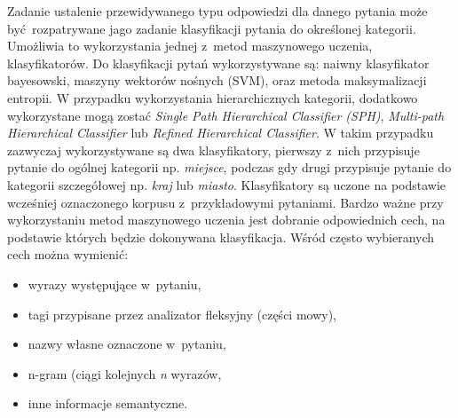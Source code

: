\documentclass[a4paper, twoside, openright, 12pt]{report}
\begin{document}
            Zadanie ustalenie przewidywanego typu odpowiedzi dla danego pytania może być rozpatrywane jago zadanie
            klasyfikacji pytania do określonej kategorii. Umożliwia to wykorzystania jednej z~metod maszynowego uczenia,
            klasyfikatorów. Do klasyfikacji pytań wykorzystywane są: naiwny klasyfikator bayesowski, maszyny wektorów
            nośnych (SVM), oraz metoda maksymalizacji entropii. W przypadku wykorzystania hierarchicznych kategorii,
            dodatkowo wykorzystane mogą zostać \emph{Single Path Hierarchical Classifier (SPH)}, \emph{Multi-path
            Hierarchical Classifier} lub \emph{Refined Hierarchical Classifier}\cite{MLQUESTIONFOCUS}. W takim przypadku
            zazwyczaj wykorzystywane są dwa klasyfikatory, pierwszy z~nich przypisuje pytanie do ogólnej kategorii np.
            \emph{miejsce}, podczas gdy drugi przypisuje pytanie do kategorii szczegółowej np. \emph{kraj} lub \emph{miasto}.
            Klasyfikatory
            są uczone na podstawie wcześniej oznaczonego korpusu z~przykładowymi pytaniami. Bardzo ważne przy wykorzystaniu
            metod maszynowego uczenia jest dobranie odpowiednich cech, na podstawie których będzie dokonywana klasyfikacja.
            Wśród często wybieranych cech można wymienić\cite{HANDBOOKNLP}:
            \begin{itemize}
                \item wyrazy występujące w~pytaniu,
                \item tagi przypisane przez analizator fleksyjny (części mowy),
                \item nazwy własne oznaczone w~pytaniu,
                \item n-gram (ciągi kolejnych \emph{n} wyrazów,
                \item inne informacje semantyczne.
            \end{itemize}
\end{document}
